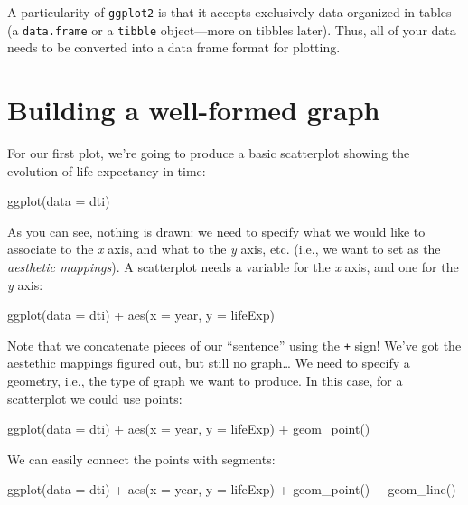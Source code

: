 \documentclass[
  letterpaper,
  DIV=11,
  numbers=noendperiod]{scrreprt}
\newenvironment{Shaded}{\begin{snugshade}}{\end{snugshade}}
\newcommand{\NormalTok}[1]{\textcolor[rgb]{0.00,0.23,0.31}{#1}}
\begin{document}
A particularity of \texttt{ggplot2} is that it accepts exclusively data
organized in tables (a \texttt{data.frame} or a \texttt{tibble}
object---more on tibbles later). Thus, all of your data needs to be
converted into a data frame format for plotting.

\section{Building a well-formed
graph}\label{building-a-well-formed-graph}

For our first plot, we're going to produce a basic scatterplot showing
the evolution of life expectancy in time:

\begin{Shaded}
\begin{Highlighting}[]
\NormalTok{ggplot(data = dti)}
\end{Highlighting}
\end{Shaded}

As you can see, nothing is drawn: we need to specify what we would like
to associate to the \emph{x} axis, and what to the \emph{y} axis, etc.
(i.e., we want to set as the \emph{aesthetic mappings}). A scatterplot
needs a variable for the \emph{x} axis, and one for the \emph{y} axis:

\begin{Shaded}
\begin{Highlighting}[]
\NormalTok{ggplot(data = dti) + aes(x = year, y = lifeExp)}
\end{Highlighting}
\end{Shaded}

Note that we concatenate pieces of our ``sentence'' using the \texttt{+}
sign! We've got the aestethic mappings figured out, but still no
graph\ldots{} We need to specify a geometry, i.e., the type of graph we
want to produce. In this case, for a scatterplot we could use points:

\begin{Shaded}
\begin{Highlighting}[]
\NormalTok{ggplot(data = dti) + aes(x = year, y = lifeExp) + geom\_point()}
\end{Highlighting}
\end{Shaded}

We can easily connect the points with segments:

\begin{Shaded}
\begin{Highlighting}[]
\NormalTok{ggplot(data = dti) + }
\NormalTok{    aes(x = year, y = lifeExp) + }
\NormalTok{    geom\_point() + }
\NormalTok{    geom\_line()}
\end{Highlighting}
\end{Shaded}
\end{document}

